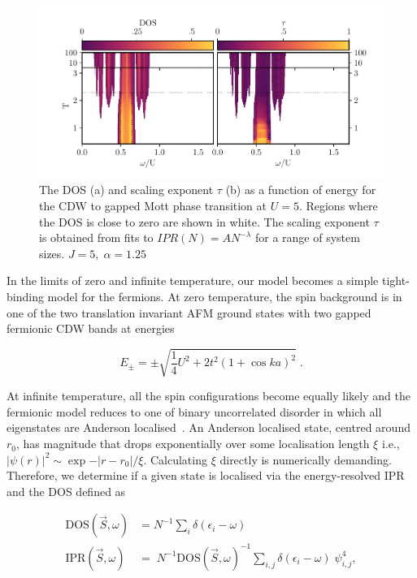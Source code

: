 \hypertarget{fig:gap_opening_U5}{%
\begin{figure}
\centering
\includegraphics[width=1\textwidth,height=\textheight]{figure_code/fk_chapter/gap_opening/gap_opening_U5}
\caption[{The transition from CDW to the Mott phase}]{The DOS (a) and scaling exponent \(\tau\) (b) as a function of energy for the CDW to gapped Mott phase transition at \(U=5\). Regions where the DOS is close to zero are shown in white. The scaling exponent \(\tau\) is obtained from fits to \(IPR(N) = A N^{-\lambda}\) for a range of system sizes. \(J = 5,\;\alpha = 1.25\)}
\label{fig:gap_opening_U5}
\end{figure}
}

In the limits of zero and infinite temperature, our model becomes a simple tight-binding model for the fermions. At zero temperature, the spin background is in one of the two translation invariant AFM ground states with two gapped fermionic CDW bands at energies

\[E_{\pm} = \pm\sqrt{\frac{1}{4}U^2 + 2t^2(1 + \cos ka)^2}\;.\]

At infinite temperature, all the spin configurations become equally likely and the fermionic model reduces to one of binary uncorrelated disorder in which all eigenstates are Anderson localised~\autocite{abrahamsScalingTheoryLocalization1979}. An Anderson localised state, centred around \(r_0\), has magnitude that drops exponentially over some localisation length \(\xi\) i.e., \(|\psi(r)|^2 \sim \exp{-|r - r_0|/\xi}\). Calculating \(\xi\) directly is numerically demanding. Therefore, we determine if a given state is localised via the energy-resolved IPR and the DOS defined as

\[\begin{aligned}
\mathrm{DOS}(\vec{S}, \omega)& = N^{-1} \sum_{i} \delta(\epsilon_i - \omega)\\
\mathrm{IPR}(\vec{S}, \omega)& = \; N^{-1} \mathrm{DOS}(\vec{S}, \omega)^{-1} \sum_{i,j} \delta(\epsilon_i - \omega)\;\psi^{4}_{i,j},\end{aligned}\]

